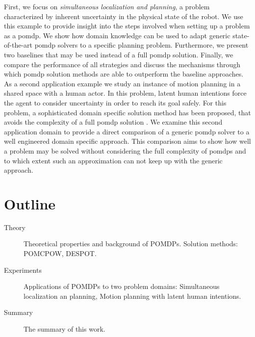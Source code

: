 First, we focus on \emph{simultaneous localization and
planning}, a problem characterized by inherent uncertainty in the physical
state of the robot. We use this example to provide insight into the steps
involved when setting up a problem as a \ac{pomdp}. We show how
domain knowledge can be used to adapt generic state-of-the-art \ac{pomdp}
solvers to a specific planning problem. Furthermore, we present two baselines
that may be used instead of a full \ac{pomdp} solution. Finally, we compare the
performance of all strategies and discuss the mechanisms through which
\ac{pomdp} solution methods are able to outperform the baseline approaches.\\
As a second application example we study an instance of motion planning in
a shared space with a human actor. In this problem, latent human intentions
force the agent to consider uncertainty in order to reach its goal safely. For
this problem, a sophisticated domain specific solution method has been
proposed, that avoids the complexity of a full \ac{pomdp} solution
\cite{fisac2018probabilistically}. We examine this second application domain to
provide a direct comparison of a generic \ac{pomdp} solver to a well engineered
domain specific approach. This comparison aims to show how well a problem may
be solved without considering the full complexity of \acp{pomdp} and to which
extent such an approximation can not keep up with the generic approach.

\section{Outline}

\begin{description}
  \item[Theory] Theoretical properties and background of POMDPs. Solution methods: POMCPOW, DESPOT.
  \item[Experiments] Applications of POMDPs to two problem domains: Simultaneous localization an planning, Motion planning with latent human intentions.
  \item[Summary] The summary of this work.
\end{description}
